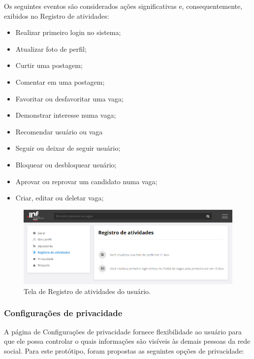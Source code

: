 \documentclass[cic,tc]{iiufrgs}
\begin{document}
Os seguintes eventos são considerados ações significativas e, consequentemente, exibidos no Registro de atividades:

\begin{itemize}
    \item Realizar primeiro login no sistema;
    \item Atualizar foto de perfil;
    \item Curtir uma postagem;
    \item Comentar em uma postagem;
    \item Favoritar ou desfavoritar uma vaga;
    \item Demonstrar interesse numa vaga;
    \item Recomendar usuário ou vaga
    \item Seguir ou deixar de seguir usuário;
    \item Bloquear ou desbloquear usuário;
    \item Aprovar ou reprovar um candidato numa vaga;
    \item Criar, editar ou deletar vaga;
\end{itemize}

\begin{figure}[h]
    \caption{Tela de Registro de atividades do usuário.}
        \begin{center}
            \includegraphics[width=1\textwidth]{figuras/config_03.png}
        \end{center}
    \label{telaConfigLog}
\end{figure}

\subsubsection{Configurações de privacidade}
\label{PDVFunConfiguracoesPrivacidade}

A página de Configurações de privacidade fornece flexibilidade ao usuário para que ele possa controlar o quais informações são visíveis às demais pessoas da rede social. Para este protótipo, foram propostas as seguintes opções de privacidade:
\end{document}

